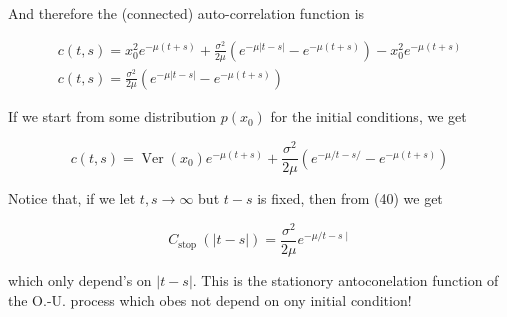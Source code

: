\documentclass[10pt]{article}
\begin{document}
And therefore the (connected) auto-correlation function is


\begin{gather*}
c(t, s)=x_{0}^{2} e^{-\mu(t+s)}+\frac{\sigma^{2}}{2 \mu}\left(e^{-\mu|t-s|}-e^{-\mu(t+s)}\right)-x_{0}^{2} e^{-\mu(t+s)} \\
c(t, s)=\frac{\sigma^{2}}{2 \mu}\left(e^{-\mu|t-s|}-e^{-\mu(t+s)}\right) \tag{40}
\end{gather*}


If we start from some distribution $p\left(x_{0}\right)$ for the initial conditions, we get

$$
c(t, s)=\operatorname{Ver}\left(x_{0}\right) e^{-\mu(t+s)}+\frac{\sigma^{2}}{2 \mu}\left(e^{-\mu / t-s /}-e^{-\mu(t+s)}\right)
$$

Notice that, if we let $t, s \rightarrow \infty$ but $t-s$ is fixed, then from (40) we get


\begin{equation*}
C_{\text {stop }}(|t-s|)=\frac{\sigma^{2}}{2 \mu} e^{-\mu / t-s \mid} \tag{41}
\end{equation*}


which only depend's on $|t-s|$. This is the stationory antoconelation function of the O.-U. process which obes not depend on ony initial condition!
\end{document}
